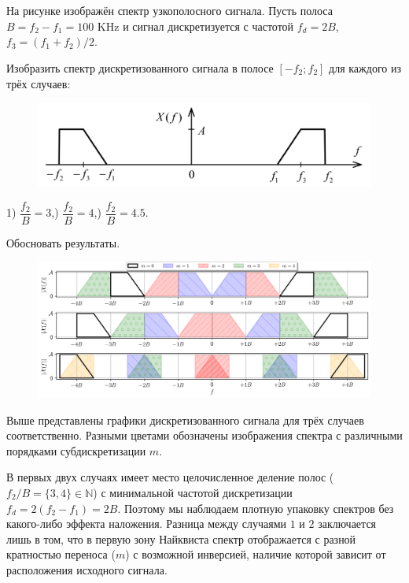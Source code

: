 \protect\thispagestyle{fancy}
\section{}
На рисунке изображён спектр узкополосного сигнала. Пусть полоса $B=f_2-f_1=100$ KHz и сигнал дискретизуется с частотой $f_d = 2B$, $f_3 = (f_1 + f_2)/2$.

Изобразить спектр дискретизованного сигнала в полосе $[-f_2; f_2]$ для каждого из трёх случаев:

\begin{figure}[h]
	\centering
	\includegraphics[width=0.8\linewidth]{pics/spring/11/11-1-0.png}
	\label{fig:11-1-0}
\end{figure}


\begin{center}
	1) $\dfrac{f_2}{B} = 3$,) $\dfrac{f_2}{B} = 4$,) $\dfrac{f_2}{B}=4.5$.
\end{center}
Обосновать результаты.

\begin{figure}[h]
	\centering
	\includegraphics[width=\linewidth]{pics/spring/11/11-1-1.png}
	\label{fig:11-1-1}
\end{figure}

Выше представлены графики дискретизованного сигнала для трёх случаев соответственно. Разными цветами обозначены изображения спектра с различными порядками субдискретизации $m$.

В первых двух случаях имеет место целочисленное деление полос ($f_2/B = \{3, 4\} \in \mathbb{N}$) с минимальной частотой дискретизации $f_d = 2(f_2 - f_1) = 2B$. Поэтому мы наблюдаем плотную упаковку спектров без какого-либо эффекта наложения. Разница между случаями $1$ и $2$ заключается лишь в том, что в первую зону Найквиста спектр отображается с разной кратностью переноса ($m$) с возможной инверсией, наличие которой зависит от расположения исходного сигнала.


